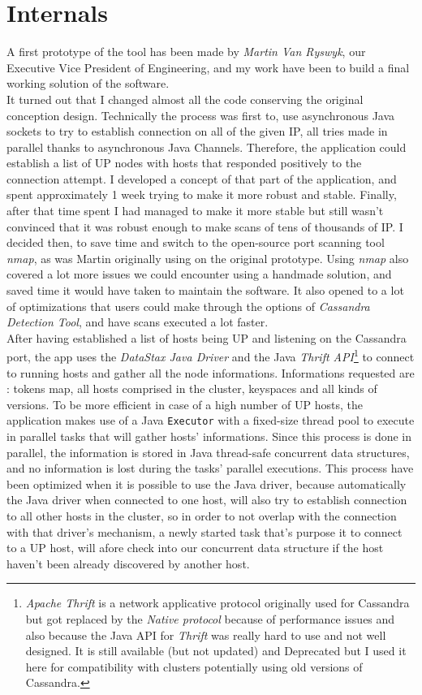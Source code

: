 \documentclass[a4paper]{report}
\newcommand{\djd}{\emph{DataStax Java Driver\xspace}}
\begin{document}
\section{Internals}
A first prototype of the tool has been made by \emph{Martin Van Ryswyk}, our Executive Vice President of Engineering, and my work have been to build a final working solution of the software.\\
It turned out that I changed almost all the code conserving the original conception design. Technically the process was first to, use asynchronous Java sockets to try to establish connection on all of the given IP, all tries made in parallel thanks to asynchronous Java Channels. Therefore, the application could establish a list of UP nodes with hosts that responded positively to the connection attempt. I developed a concept of that part of the application, and spent approximately 1 week trying to make it more robust and stable. Finally, after that time spent I had managed to make it more stable but still wasn't convinced that it was robust enough to make scans of tens of thousands of IP. I decided then, to save time and switch to the open-source port scanning tool \emph{nmap}, as was Martin originally using on the original prototype. Using \emph{nmap} also covered a lot more issues we could encounter using a handmade solution, and saved time it would have taken to maintain the software. It also opened to a lot of optimizations that users could make through the options of \emph{Cassandra Detection Tool}, and have scans executed a lot faster.\\
After having established a list of hosts being UP and listening on the Cassandra port, the app uses the \djd{} and the Java \emph{Thrift API}\footnote{\emph{Apache Thrift} is a network applicative protocol originally used for Cassandra but got replaced by the \emph{Native protocol} because of performance issues and also because the Java API for \emph{Thrift} was really hard to use and not well designed. It is still available (but not updated) and Deprecated but I used it here for compatibility with clusters potentially using old versions of Cassandra.} to connect to running hosts and gather all the node informations. Informations requested are : tokens map, all hosts comprised in the cluster, keyspaces and all kinds of versions. To be more efficient in case of a high number of UP hosts, the application makes use of a Java \verb;Executor; with a fixed-size thread pool to execute in parallel tasks that will gather hosts' informations. Since this process is done in parallel, the information is stored in Java thread-safe concurrent data structures, and no information is lost during the tasks' parallel executions. This process have been optimized when it is possible to use the Java driver, because automatically the Java driver when connected to one host, will also try to establish connection to all other hosts in the cluster, so in order to not overlap with the connection with that driver's mechanism, a newly started task that's purpose it to connect to a UP host, will afore check into our concurrent data structure if the host haven't been already discovered by another host.
\end{document}
